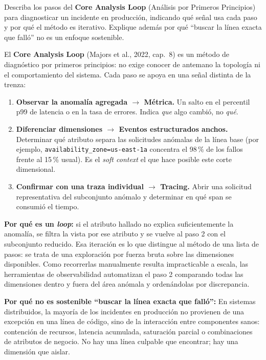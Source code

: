 \documentclass[variant=guia,cover=institutional,mode=screen]{ua-engineering-v6-article}
\begin{document}
\begin{uaexercise}
Describa los pasos del \textbf{Core Analysis Loop} (Análisis por Primeros Principios) para diagnosticar un incidente en producción, indicando qué señal usa cada paso y por qué el método es iterativo. Explique además por qué ``buscar la línea exacta que falló'' no es un enfoque sostenible.
\end{uaexercise}
\begin{uaanswer}
El \textbf{Core Analysis Loop} (Majors et al., 2022, cap.~8) es un método de diagnóstico por primeros principios: no exige conocer de antemano la topología ni el comportamiento del sistema. Cada paso se apoya en una señal distinta de la trenza:
\begin{enumerate}
\item \textbf{Observar la anomalía agregada $\rightarrow$ Métrica.} Un salto en el percentil p99 de latencia o en la tasa de errores. Indica \emph{que} algo cambió, no \emph{qué}.
\item \textbf{Diferenciar dimensiones $\rightarrow$ Eventos estructurados anchos.} Determinar qué atributo separa las solicitudes anómalas de la línea base (por ejemplo, \texttt{availability\_zone=us-east-1a} concentra el 98\,\% de los fallos frente al 15\,\% usual). Es el \emph{soft context} el que hace posible este corte dimensional.
\item \textbf{Confirmar con una traza individual $\rightarrow$ Tracing.} Abrir una solicitud representativa del subconjunto anómalo y determinar en qué span se consumió el tiempo.
\end{enumerate}

\textbf{Por qué es un \emph{loop}:} si el atributo hallado no explica suficientemente la anomalía, se filtra la vista por ese atributo y se vuelve al paso 2 con el subconjunto reducido. Esa iteración es lo que distingue al método de una lista de pasos: se trata de una exploración por fuerza bruta sobre las dimensiones disponibles. Como recorrerlas manualmente resulta impracticable a escala, las herramientas de observabilidad automatizan el paso 2 comparando todas las dimensiones dentro y fuera del área anómala y ordenándolas por discrepancia.

\textbf{Por qué no es sostenible ``buscar la línea exacta que falló'':}
En sistemas distribuidos, la mayoría de los incidentes en producción no provienen de una excepción en una línea de código, sino de la interacción entre componentes sanos: contención de recursos, latencia acumulada, saturación parcial o combinaciones de atributos de negocio. No hay una línea culpable que encontrar; hay una dimensión que aislar.
\end{uaanswer}
\end{document}
